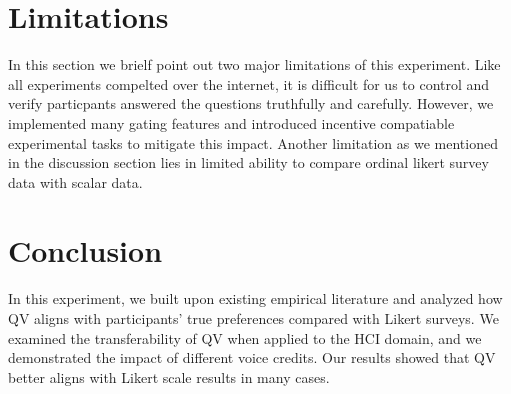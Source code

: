 \section{Limitations} \label{future}
In this section we brielf point out two major limitations of this experiment. Like all experiments compelted over the internet, it is difficult for us to control and verify particpants answered the questions truthfully and carefully. However, we implemented many gating features and introduced incentive compatiable experimental tasks to mitigate this impact. Another limitation as we mentioned in the discussion section lies in limited ability to compare ordinal likert survey data with scalar data.


\section{Conclusion} \label{conclusion}
In this experiment, we built upon existing empirical literature and analyzed how QV aligns with participants' true preferences compared with Likert surveys. We examined the transferability of QV when applied to the HCI domain, and we demonstrated the impact of different voice credits. Our results showed that QV better aligns with Likert scale results in many cases.






